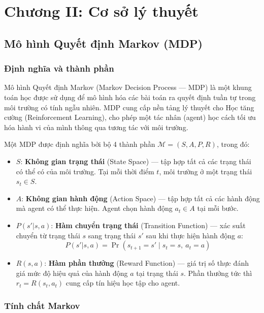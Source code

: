 \section{Chương II: Cơ sở lý thuyết}

\subsection{Mô hình Quyết định Markov (MDP)}

\subsubsection{Định nghĩa và thành phần}

Mô hình Quyết định Markov (Markov Decision Process --- MDP) là một khung toán học được sử dụng để mô hình hóa các bài toán ra quyết định tuần tự trong môi trường có tính ngẫu nhiên. MDP cung cấp nền tảng lý thuyết cho Học tăng cường (Reinforcement Learning), cho phép một tác nhân (agent) học cách tối ưu hóa hành vi của mình thông qua tương tác với môi trường.

Một MDP được định nghĩa bởi bộ 4 thành phần $\mathcal{M} = (S, A, P, R)$, trong đó:

\begin{itemize}
    \item $S$: \textbf{Không gian trạng thái} (State Space) --- tập hợp tất cả các trạng thái có thể có của môi trường. Tại mỗi thời điểm $t$, môi trường ở một trạng thái $s_t \in S$.

    \item $A$: \textbf{Không gian hành động} (Action Space) --- tập hợp tất cả các hành động mà agent có thể thực hiện. Agent chọn hành động $a_t \in A$ tại mỗi bước.

    \item $P(s' | s, a)$: \textbf{Hàm chuyển trạng thái} (Transition Function) --- xác suất chuyển từ trạng thái $s$ sang trạng thái $s'$ sau khi thực hiện hành động $a$:
    \[
    P(s' | s, a) = \Pr(s_{t+1} = s' \mid s_t = s,\ a_t = a)
    \]

    \item $R(s, a)$: \textbf{Hàm phần thưởng} (Reward Function) --- giá trị số thực đánh giá mức độ hiệu quả của hành động $a$ tại trạng thái $s$. Phần thưởng tức thì $r_t = R(s_t, a_t)$ cung cấp tín hiệu học tập cho agent.
\end{itemize}

\subsubsection{Tính chất Markov}

